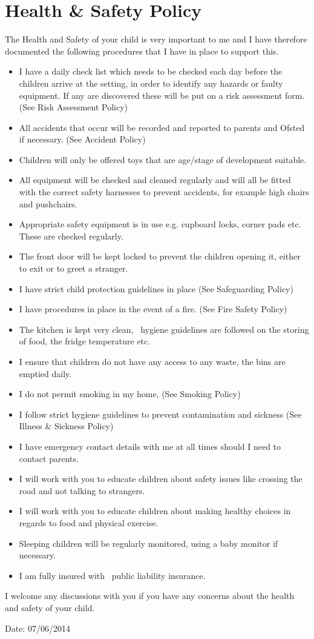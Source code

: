 
\section{Health \& Safety Policy}

The Health and Safety of your child is very important to me and I have
therefore documented the following procedures that I have in place to
support this.

\begin{itemize}
\item
  I have a daily check list which needs to be checked each day before
  the children arrive at the setting, in order to identify any hazards
  or faulty equipment. If any are discovered these will be put on a risk
  assessment form. (See Risk Assessment Policy)
\item
  All accidents that occur will be recorded and reported to parents and
  Ofsted if necessary. (See Accident Policy)
\item
  Children will only be offered toys that are age/stage of development
  suitable.
\item
  All equipment will be checked and cleaned regularly and will all be
  fitted with the correct safety harnesses to prevent accidents, for
  example high chairs and pushchairs.
\item
  Appropriate safety equipment is in use e.g. cupboard locks, corner
  pads etc. These are checked regularly.
\item
  The front door will be kept locked to prevent the children opening
  it, either to exit or to greet a stranger.
\item
  I have strict child protection guidelines in place (See Safeguarding
  Policy)
\item
  I have procedures in place in the event of a fire. (See Fire Safety
  Policy)
\item
  The kitchen is kept very clean, ~hygiene guidelines are followed on
  the storing of food, the fridge temperature etc.
\item
  I ensure that children do not have any access to any waste, the bins
  are emptied daily.
\item
  I do not permit smoking in my home, (See Smoking Policy)
\item
  I follow strict hygiene guidelines to prevent contamination and
  sickness (See Illness \& Sickness Policy)
\item
  I have emergency contact details with me at all times should I need
  to contact parents.
\item
  I will work with you to educate children about safety issues like
  crossing the road and not talking to strangers.
\item
  I will work with you to educate children about making healthy choices
  in regards to food and physical exercise.
\item
  Sleeping children will be regularly monitored, using a baby monitor
  if necessary.
\item
  I am fully insured with ~public liability insurance.
\end{itemize}

I welcome any discussions with you if you have any concerns about the
health and safety of your child.

Date: 07/06/2014


